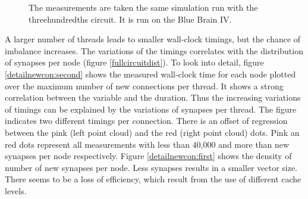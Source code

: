 \begin{figure}[ht!]
     \begin{center}
        \hspace{0.2cm}
    \end{center}
    \caption{%
        The measurements are taken the same simulation run with the threehundredths circuit. It is run on the Blue Brain IV.
     }%
   \label{detailnewcon}
\end{figure}

A larger number of threads leads to smaller wall-clock timings, but the chance of imbalance increases.
The variations of the timings correlates with the distribution of synapses per node (figure \ref{fullcircuitdist}).
To look into detail, figure \ref{detailnewcon:second} shows the measured wall-clock time for each node
plotted over the maximum number of new connections per thread. It shows a strong correlation between the variable and
the duration. Thus the increasing variations of timings can be explained by the variations of synapses per thread.
The figure indicates two different timings per connection. There is an offset of regression between the pink
(left point cloud)
and the red (right point cloud) dots. Pink an red dots represent all measurements with less than 40,000 and more than new synapses per
node respectively. Figure \ref{detailnewcon:first} shows the density of number of new synapses per node.
Less synapses results in a smaller vector size. There seems to be a loss of efficiency, which result from
the use of different cache levels.

